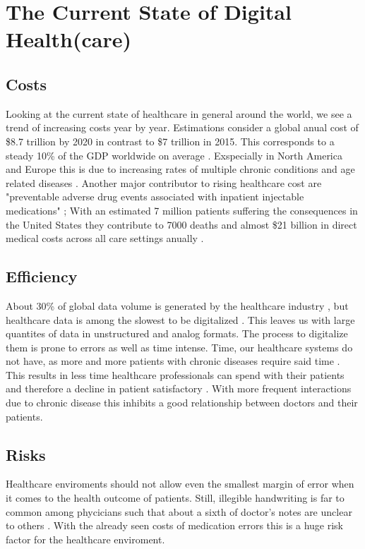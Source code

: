 \section{The Current State of Digital Health(care)}
\subsection{Costs}
Looking at the current state of healthcare in general around the world, we see a trend of increasing costs year by year. Estimations consider a global anual cost of \$8.7 trillion by 2020 in contrast to \$7 trillion in 2015. This corresponds to a steady 10\% of the GDP worldwide on average \cite{EIU2016}. Exspecially in North America and Europe this is due to increasing rates of multiple chronic conditions and age related diseases \cite{sambamoorthi2015multiple}. Another major contributor to rising healthcare cost are "preventable adverse drug events associated with inpatient injectable medications" \cite{lahue2012national}; With an estimated 7 million patients suffering the consequences in the United States they contribute to 7000 deaths and almost \$21 billion in direct medical costs across all care settings anually \cite{prevMedErrors}.
\subsection{Efficiency}
About 30\% of global data volume is generated by the healthcare industry \cite{gopal2019digital}, but healthcare data is among the slowest to be digitalized \cite{industryDigitalization}. This leaves us with large quantites of data in unstructured and analog formats. The process to digitalize them is prone to errors as well as time intense. Time, our healthcare systems do not have, as more and more patients with chronic diseases require said time \cite{ostbye2005there}. This results in less time healthcare professionals can spend with their patients \cite{fuchtbauer2013emergency} and therefore a decline in patient satisfactory \cite{gross1998patient}. With more frequent interactions due to chronic disease this inhibits a good relationship between doctors and their patients.
\subsection{Risks}
Healthcare enviroments should not allow even the smallest margin of error when it comes to the health outcome of patients. Still, illegible handwriting is far to common among phycicians such that about a sixth of doctor's notes are unclear to others \cite{rodriguez2002illegible}. With the already seen costs of medication errors this is a huge risk factor for the healthcare enviroment.

